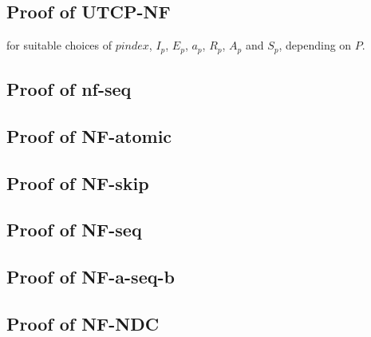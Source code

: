 \subsection{Proof of UTCP-NF}

for suitable choices of $pindex$, $I_p$, $E_p$, $a_p$, $R_p$, $A_p$ and $S_p$,
depending on $P$.

\subsection{Proof of nf-seq}




\subsection{Proof of NF-atomic}



\subsection{Proof of NF-skip}


\subsection{Proof of NF-seq}


\subsection{Proof of NF-a-seq-b}


\subsection{Proof of NF-NDC}

